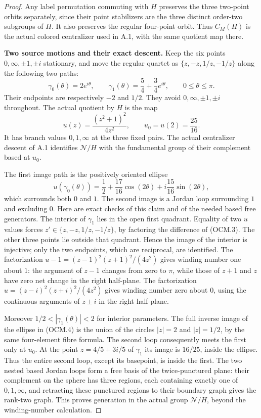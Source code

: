\begin{proof}
Any label permutation commuting with $H$ preserves the
three two-point orbits separately, since their point
stabilizers are the three distinct order-two subgroups
of $H$.  It also preserves the regular four-point orbit.
Thus $C_M(H)$ is the actual colored centralizer used
in A.1, with the same quotient map there.
\par\medskip\noindent\textbf{Two source motions and their exact descent.}\quad
Keep the six points $0,\infty,\pm1,\pm i$ stationary,
and move the regular quartet as
$\{z,-z,1/z,-1/z\}$ along the following two paths:
\[
 \gamma_0(\theta)=2e^{i\theta},\qquad
 \gamma_1(\theta)=\frac54+\frac34e^{i\theta},
                 \qquad 0\leq\theta\leq\pi.
                                                               \tag{OCM.2}
\]
Their endpoints are respectively $-2$ and $1/2$.
They avoid $0,\infty,\pm1,\pm i$ throughout.
The actual quotient by $H$ is the map
\[
             u(z)=\frac{(z^2+1)^2}{4z^2},
       \qquad u_0=u(2)=\frac{25}{16}.
                                                               \tag{OCM.3}
\]
It has branch values $0,1,\infty$ at the three fixed
pairs.  The actual centralizer descent of A.1 identifies
$\mathcal N/H$ with the fundamental group of their
complement based at $u_0$.

The first image path is the positively oriented ellipse
\[
 u(\gamma_0(\theta))
   =\frac12+\frac{17}{16}\cos(2\theta)
                         +i\frac{15}{16}\sin(2\theta),
                                                               \tag{OCM.4}
\]
which surrounds both $0$ and $1$.
The second image is a Jordan loop surrounding $1$
and excluding $0$.  Here are exact checks of this
claim and of the needed based free generators.
The interior of $\gamma_1$ lies in the open first
quadrant.  Equality of two $u$ values forces
$z'\in\{z,-z,1/z,-1/z\}$, by factoring the difference
of (OCM.3).  The other three points lie outside that
quadrant.  Hence the image of the interior is injective;
only the two endpoints, which are reciprocal, are
identified.
The factorization
$u-1=(z-1)^2(z+1)^2/(4z^2)$ gives winding number one
about $1$: the argument of $z-1$ changes from zero to
$\pi$, while those of $z+1$ and $z$ have zero net
change in the right half-plane.
The factorization
$u=(z-i)^2(z+i)^2/(4z^2)$ gives winding number zero
about $0$, using the continuous arguments of $z\pm i$
in the right half-plane.

Moreover $1/2<|\gamma_1(\theta)|<2$ for interior
parameters.  The full inverse image of the ellipse
in (OCM.4) is the union of the circles $|z|=2$ and
$|z|=1/2$, by the same four-element fibre formula.
The second loop consequently meets the first only at
$u_0$.  At the point $z=4/5+3i/5$ of $\gamma_1$ its
image is $16/25$, inside the ellipse.  Thus the entire
second loop, except its basepoint, is inside the first.
The two nested based Jordan loops form a free basis
of the twice-punctured plane: their complement on the
sphere has three regions, each containing exactly one
of $0,1,\infty$, and retracting these punctured regions
to their boundary graph gives the rank-two graph.
This proves generation in the actual group
$\mathcal N/H$, beyond the winding-number calculation.


\end{proof}
